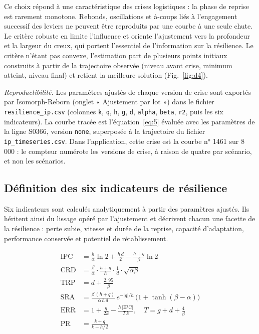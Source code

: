 Ce choix répond à une caractéristique des crises logistiques : la phase de reprise est rarement monotone. Rebonds, oscillations et à-coups liés à l'engagement successif des leviers ne peuvent être reproduits par une courbe à une seule chute. Le critère robuste en limite l'influence et oriente l'ajustement vers la profondeur et la largeur du creux, qui portent l'essentiel de l'information sur la résilience. Le critère n'étant pas convexe, l'estimation part de plusieurs points initiaux construits à partir de la trajectoire observée (niveau avant crise, minimum atteint, niveau final) et retient la meilleure solution (Fig.~\ref{fig:d4}).

\begin{center}

\label{fig:d4}
\end{center}

\textit{Reproductibilité.} Les paramètres ajustés de chaque version de crise sont exportés par Isomorph-Reborn (onglet « Ajustement par lot ») dans le fichier \texttt{resilience\_ip.csv} (colonnes \texttt{k}, \texttt{q}, \texttt{h}, \texttt{g}, \texttt{d}, \texttt{alpha}, \texttt{beta}, \texttt{r2}, puis les six indicateurs). La courbe tracée est l'équation~\eqref{eq:5} évaluée avec les paramètres de la ligne S0366, version \texttt{none}, superposée à la trajectoire du fichier \texttt{ip\_timeseries.csv}. Dans l'application, cette crise est la courbe n° 1461 sur 8 000 : le compteur numérote les versions de crise, à raison de quatre par scénario, et non les scénarios.

\subsection{Définition des six indicateurs de résilience}
\label{sec:4.3}

Six indicateurs sont calculés analytiquement à partir des paramètres ajustés. Ils héritent ainsi du lissage opéré par l'ajustement et décrivent chacun une facette de la résilience : perte subie, vitesse et durée de la reprise, capacité d'adaptation, performance conservée et potentiel de rétablissement.

\begin{align}
\mathrm{IPC} &= \frac{h}{\alpha}\ln 2 + \frac{h\,d}{2} - \frac{h + q}{\beta}\ln 2 \label{eq:7} \\
\mathrm{CRD} &= \frac{\beta}{\alpha}\cdot\frac{h + q}{h}\cdot\frac{1}{d}\cdot\sqrt{\alpha\beta} \label{eq:8} \\
\mathrm{TRP} &= d + \frac{2{,}95}{\beta} \label{eq:9} \\
\mathrm{SRA} &= \frac{\beta\,(h + q)}{\alpha\,h\,d}\, e^{-|q|/h}\,\big(1 + \tanh(\beta - \alpha)\big) \label{eq:10} \\
\mathrm{ERR} &= 1 + \frac{q}{2k} - \frac{h\,|\mathrm{IPC}|}{T\,k}, \quad T = g + d + \frac{4}{\beta} \label{eq:11} \\
\mathrm{PR} &= \frac{k + q}{k - h/2} \label{eq:12}
\end{align}

